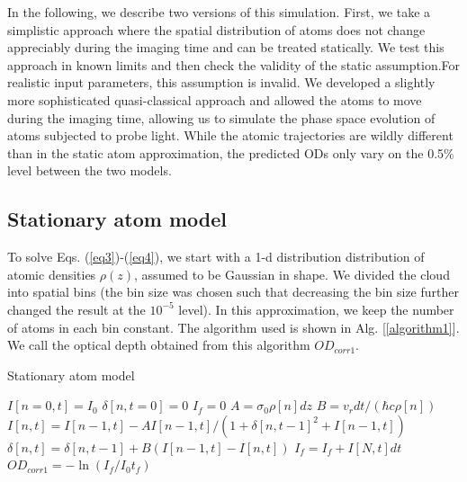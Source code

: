\documentclass[12pt]{iopart}
\begin{document}
\par In the following, we describe two versions of this simulation. First, we take a simplistic approach where the spatial distribution of atoms does not change appreciably during the imaging time and can be treated statically. We test this approach in known limits and then check the validity of the static assumption.For realistic input parameters, this assumption is invalid. We developed a slightly more sophisticated quasi-classical approach and allowed the atoms to move during the imaging time, allowing us to simulate the phase space evolution of atoms subjected to probe light. While the atomic trajectories are wildly different than in the static atom approximation, the predicted ODs only vary on the 0.5$\%$ level between the two models. 


\subsection{Stationary atom model}
To solve Eqs. (\ref{eq3})-(\ref{eq4}), we start with a 1-d distribution distribution of atomic densities $\rho(z)$, assumed to be Gaussian in shape. We divided the cloud into spatial bins (the bin size was chosen such that decreasing the bin size further changed the result at the $10^{-5}$ level).  In this approximation, we keep the number of atoms in each bin constant.  The algorithm used is shown in Alg. [\ref{algorithm1}]. We call the optical depth obtained from this algorithm $OD_{corr1}$.

\begin{algorithm}
\caption{Stationary atom model}
\label{algorithm1}
\begin{algorithmic}
\STATE $I[n=0,t]=I_0$  
\STATE $\delta[n, t=0]=0$ 
\STATE $I_f=0$ 
 \STATE $A=\sigma_0\rho[n] dz$ 
 \STATE $B=v_r dt/(\hbar c \rho[n])$  
\STATE $I[n,t]=I[n-1,t] - A I[n-1,t]/(1+\delta[n,t-1]^2+I[n-1,t])$  
\STATE $\delta[n,t]=\delta[n,t-1]+B\left(I[n-1,t]-I[n,t]\right)$   
\ENDFOR 
\STATE $I_f =I_f+ I[N,t]dt$
\ENDFOR
\STATE $OD_{corr1}=-\ln{(I_f/I_0t_f)}$
\end{algorithmic}
\end{algorithm}
\end{document}
